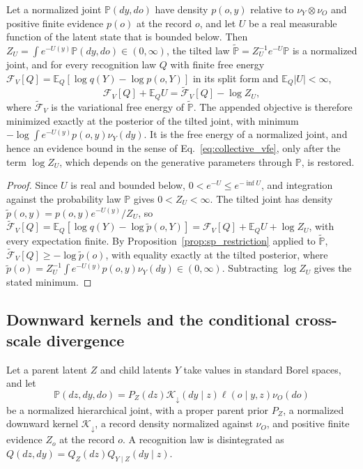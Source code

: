 \begin{proposition}\label{prop:sp_appended}
Let a normalized joint $\mathbb P(dy,do)$ have density $p(o,y)$ relative to $\nu_Y\otimes\nu_O$ and positive finite evidence $p(o)$ at the record $o$, and let $U$ be a real measurable function of the latent state that is bounded below. Then $Z_U=\int e^{-U(y)}\mathbb P(dy,do)\in(0,\infty)$, the tilted law $\widetilde{\mathbb P}=Z_U^{-1}e^{-U}\mathbb P$ is a normalized joint, and for every recognition law $Q$ with finite free energy $\mathcal F_V[Q]=\mathbb E_Q[\log q(Y)-\log p(o,Y)]$ in its split form and $\mathbb E_Q|U|<\infty$,
\begin{equation}
\mathcal F_V[Q]+\mathbb E_QU=\widetilde{\mathcal F}_V[Q]-\log Z_U,
\label{eq:sp_appended}
\end{equation}
where $\widetilde{\mathcal F}_V$ is the variational free energy of $\widetilde{\mathbb P}$. The appended objective is therefore minimized exactly at the posterior of the tilted joint, with minimum $-\log\int e^{-U(y)}p(o,y)\nu_Y(dy)$. It is the free energy of a normalized joint, and hence an evidence bound in the sense of Eq.~\eqref{eq:collective_vfe}, only after the term $\log Z_U$, which depends on the generative parameters through $\mathbb P$, is restored.
\end{proposition}
\begin{proof}
Since $U$ is real and bounded below, $0<e^{-U}\leq e^{-\inf U}$, and integration against the probability law $\mathbb P$ gives $0<Z_U<\infty$. The tilted joint has density $\tilde p(o,y)=p(o,y)e^{-U(y)}/Z_U$, so
$\widetilde{\mathcal F}_V[Q]=\mathbb E_Q[\log q(Y)-\log\tilde p(o,Y)]=\mathcal F_V[Q]+\mathbb E_QU+\log Z_U$, with every expectation finite. By Proposition~\ref{prop:sp_restriction} applied to $\widetilde{\mathbb P}$, $\widetilde{\mathcal F}_V[Q]\geq-\log\tilde p(o)$, with equality exactly at the tilted posterior, where $\tilde p(o)=Z_U^{-1}\int e^{-U(y)}p(o,y)\nu_Y(dy)\in(0,\infty)$. Subtracting $\log Z_U$ gives the stated minimum.
\end{proof}

\subsection{Downward kernels and the conditional cross-scale divergence}\label{app:sp_downward}
Let a parent latent $Z$ and child latents $Y$ take values in standard Borel spaces, and let
\begin{equation}
\mathbb P(dz,dy,do)=P_Z(dz)\mathcal K_\downarrow(dy\mid z)\ell(o\mid y,z)\nu_O(do)
\label{eq:sp_downward_joint}
\end{equation}
be a normalized hierarchical joint, with a proper parent prior $P_Z$, a normalized downward kernel $\mathcal K_\downarrow$, a record density normalized against $\nu_O$, and positive finite evidence $Z_o$ at the record $o$. A recognition law is disintegrated as $Q(dz,dy)=Q_Z(dz)Q_{Y\mid Z}(dy\mid z)$.

